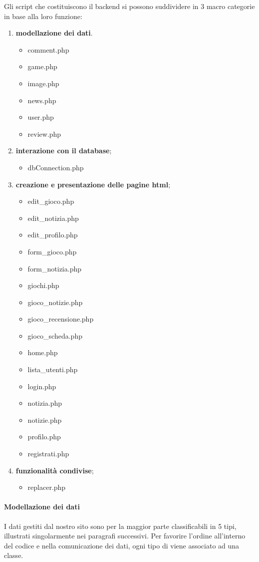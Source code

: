 Gli script che costituiscono il backend si possono suddividere in 3 macro categorie in base alla loro funzione:
\begin{enumerate}
	\item \textbf{modellazione dei dati}.
	\begin{itemize}
		\item comment.php
		\item game.php
		\item image.php
		\item news.php
		\item user.php
		\item review.php
	\end{itemize}
	\item \textbf{interazione con il database};
	\begin{itemize}
		\item dbConnection.php
	\end{itemize}
	\item \textbf{creazione e presentazione delle pagine html};
	\begin{itemize}
		\item edit\_gioco.php
		\item edit\_notizia.php
		\item edit\_profilo.php
		\item form\_gioco.php
		\item form\_notizia.php
		\item giochi.php
		\item gioco\_notizie.php
		\item gioco\_recensione.php
		\item gioco\_scheda.php
		\item home.php
		\item lista\_utenti.php
		\item login.php
		\item notizia.php
		\item notizie.php
		\item profilo.php
		\item registrati.php
	\end{itemize}
	\item \textbf{funzionalità condivise};
	\begin{itemize}
		\item replacer.php
	\end{itemize}
\end{enumerate}
\paragraph{Modellazione dei dati}
I dati gestiti dal nostro sito sono per la maggior parte classificabili in 5 tipi, illustrati singolarmente nei paragrafi successivi. Per favorire l'ordine all'interno del codice e nella comunicazione dei dati, ogni tipo di viene associato ad una classe.

